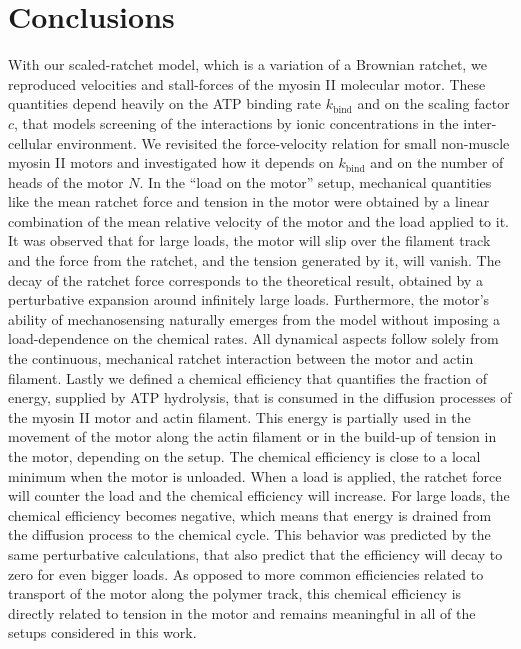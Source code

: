 \documentclass[aps,pre,twocolumn,showpacs,showkeys,superscriptaddress,floatfix]{revtex4-1}
\begin{document}
\section{Conclusions}
With our scaled-ratchet model, which is a variation of a Brownian ratchet, we reproduced velocities and stall-forces of the myosin II molecular motor. 
These quantities depend heavily on the ATP binding rate $k_\text{bind}$ and on the scaling factor $c$, that models screening of the interactions by ionic concentrations in the inter-cellular environment.
We revisited the force-velocity relation for small non-muscle myosin II motors 
and investigated how it depends on $k_\text{bind}$ and on the number of heads of the motor $N$.
In the ``load on the motor'' setup, mechanical quantities like the mean ratchet force and tension in the motor were obtained by a linear combination of the mean relative velocity of the motor and the load applied to it. 
It was observed that for large loads, the motor will slip over the filament track and the force from the ratchet, and the tension generated by it, will vanish.
The decay of the ratchet force corresponds to the theoretical result, obtained by a perturbative expansion around infinitely large loads.
Furthermore, the motor's ability of mechanosensing naturally emerges from the model without imposing a load-dependence on the chemical rates.
All dynamical aspects follow solely from the continuous, mechanical ratchet interaction between the motor and actin filament.
Lastly we defined a chemical efficiency that quantifies the fraction of energy, supplied by ATP hydrolysis, 
that is consumed in the diffusion processes of the myosin II motor and actin filament.
This energy is partially used in the movement of the motor along the actin filament or in the build-up of tension in the motor, depending on the setup. 
The chemical efficiency is close to a local minimum when the motor is unloaded. 
When a load is applied, the ratchet force will counter the load and the chemical efficiency will increase. 
For large loads, the chemical efficiency becomes negative, which means that energy is drained from the diffusion process to the chemical cycle.
This behavior was predicted by the same perturbative calculations, that also predict that the efficiency will decay to zero for even bigger loads.
As opposed to more common efficiencies related to transport of the motor along the polymer track, this chemical efficiency is directly related to tension in the motor and remains meaningful in all of the setups considered in this work. 
\end{document}
